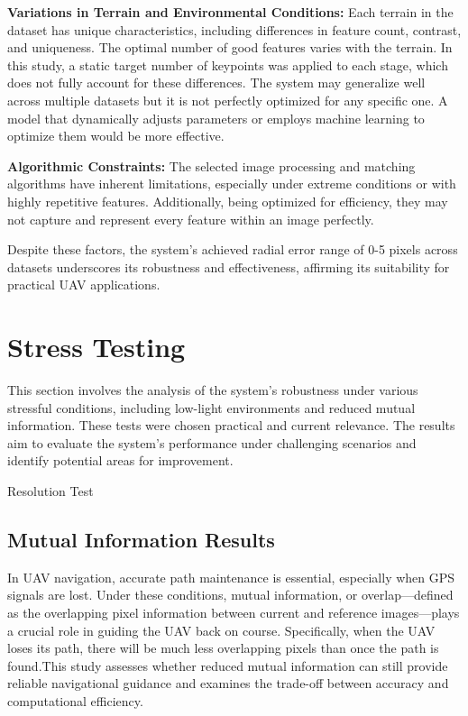 \textbf{Variations in Terrain and Environmental Conditions:} Each terrain in the dataset has unique characteristics, including differences in feature count, contrast, and uniqueness. The optimal number of good features varies with the terrain. In this study, a static target number of keypoints was applied to each stage, which does not fully account for these differences. The system may generalize well across multiple datasets but it is not perfectly optimized for any specific one. A model that dynamically adjusts parameters or employs machine learning to optimize them would be more effective.

\textbf{Algorithmic Constraints:} The selected image processing and matching algorithms have inherent limitations, especially under extreme conditions or with highly repetitive features. Additionally, being optimized for efficiency, they may not capture and represent every feature within an image perfectly.

Despite these factors, the system's achieved radial error range of 0-5 pixels across datasets underscores its robustness and effectiveness, affirming its suitability for practical UAV applications.

\section{Stress Testing}

This section involves the analysis of the system's robustness under various stressful conditions, including low-light environments and reduced mutual information. These tests were chosen practical and current relevance. The results aim to evaluate the system's performance under challenging scenarios and identify potential areas for improvement.

Resolution Test

\subsection{Mutual Information Results}

In UAV navigation, accurate path maintenance is essential, especially when GPS signals are lost. Under these conditions, mutual information, or overlap—defined as the overlapping pixel information between current and reference images—plays a crucial role in guiding the UAV back on course. Specifically, when the UAV loses its path, there will be much less overlapping pixels than once the path is found.This study assesses whether reduced mutual information can still provide reliable navigational guidance and examines the trade-off between accuracy and computational efficiency.


